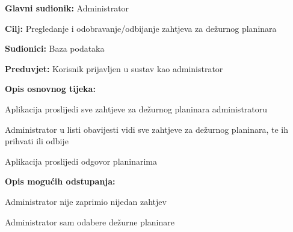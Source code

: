 		\noindent {}
		\begin{packed_item}
			
			\item \textbf{Glavni sudionik: }$ $Administrator$ $
			\item  \textbf{Cilj:} $ $Pregledanje i odobravanje/odbijanje zahtjeva za dežurnog planinara$ $
			\item  \textbf{Sudionici:} $ $Baza podataka$ $
			\item  \textbf{Preduvjet:} $ $Korisnik prijavljen u sustav kao administrator $ $
			\item  \textbf{Opis osnovnog tijeka:}
			
			\item[] \begin{packed_enum}
				
				\item $ $Aplikacija proslijedi sve zahtjeve za dežurnog planinara administratoru$ $
		
				\item $ $Administrator u listi obavijesti vidi sve zahtjeve za dežurnog planinara, te ih prihvati ili odbije$ $
				\item $ $Aplikacija proslijedi odgovor planinarima$ $
			\end{packed_enum}
		\item  \textbf{Opis mogućih odstupanja:}
		
		\item[] \begin{packed_item}
			
			\item[2.a] $ $Administrator nije zaprimio nijedan zahtjev$ $
			\item[] \begin{packed_enum}
				
				\item $ $Administrator sam odabere dežurne planinare$ $
			\end{packed_enum}
		\end{packed_item}
		\end{packed_item}
	
